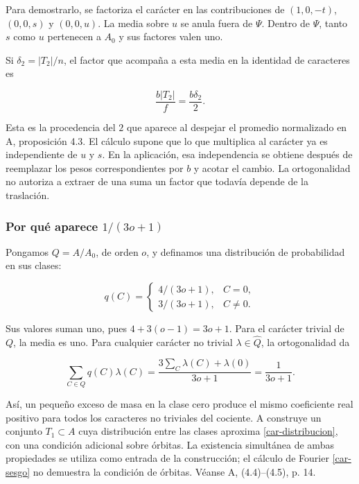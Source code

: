 Para demostrarlo, se factoriza el carácter en las contribuciones de $(1,0,-t)$, $(0,0,s)$ y $(0,0,u)$. La media sobre $u$ se anula fuera de $\Psi$. Dentro de $\Psi$, tanto $s$ como $u$ pertenecen a $A_0$ y sus factores valen uno.

Si $\delta_2=|T_2|/n$, el factor que acompaña a esta media en la identidad de caracteres es

\begin{equation}
\frac{b|T_2|}{f}=\frac{b\delta_2}{2}.
\label{car-factor-medio}
\end{equation}

Esta es la procedencia del $2$ que aparece al despejar el promedio normalizado en A, proposición 4.3. El cálculo supone que lo que multiplica al carácter ya es independiente de $u$ y $s$. En la aplicación, esa independencia se obtiene después de reemplazar los pesos correspondientes por $b$ y acotar el cambio. La ortogonalidad no autoriza a extraer de una suma un factor que todavía depende de la traslación.

\subsubsection*{Por qué aparece $1/(3o+1)$}

Pongamos $Q=A/A_0$, de orden $o$, y definamos una distribución de probabilidad en sus clases:

\begin{equation}
q(C)=
\begin{cases}
4/(3o+1),&C=0,\\
3/(3o+1),&C\ne0.
\end{cases}
\label{car-distribucion}
\end{equation}

Sus valores suman uno, pues $4+3(o-1)=3o+1$. Para el carácter trivial de $Q$, la media es uno. Para cualquier carácter no trivial $\lambda\in\widehat Q$, la ortogonalidad da

\begin{equation}
\sum_{C\in Q}q(C)\lambda(C)
=\frac{3\sum_C\lambda(C)+\lambda(0)}{3o+1}
=\frac1{3o+1}.
\label{car-sesgo}
\end{equation}

Así, un pequeño exceso de masa en la clase cero produce el mismo coeficiente real positivo para todos los caracteres no triviales del cociente. A construye un conjunto $T_1\subset A$ cuya distribución entre las clases aproxima \eqref{car-distribucion}, con una condición adicional sobre órbitas. La existencia simultánea de ambas propiedades se utiliza como entrada de la construcción; el cálculo de Fourier \eqref{car-sesgo} no demuestra la condición de órbitas. Véanse A, (4.4)–(4.5), p. 14.

